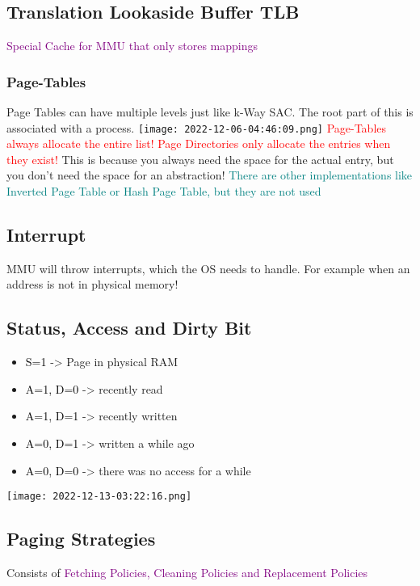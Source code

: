 \documentclass[main.tex,fontsize=8pt,paper=a4,paper=landscape,DIV=calc,]{scrartcl}
\begin{document}
\begin{multicols*}{4}
\subsection{Translation Lookaside Buffer TLB}
\textcolor{purple}{Special Cache for MMU that only stores mappings}

\subsubsection{Page-Tables}
Page Tables can have multiple levels just like k-Way SAC.\newline
The root part of this is associated with a process.\newline
\texttt{[image: 2022-12-06-04:46:09.png]}\newline
\textcolor{red}{Page-Tables always allocate the entire list! Page Directories only allocate the entries when they exist!}\newline
This is because you always need the space for the actual entry, but you don't need the space for an abstraction!
\textcolor{teal}{There are other implementations like Inverted Page Table or Hash Page Table, but they are not used}

\subsection{Interrupt}
MMU will throw interrupts, which the OS needs to handle.\newline
For example when an address is not in physical memory!\newline

\subsection{Status, Access and Dirty Bit}
\begin{itemize}
\item \textcolor{black}{S=1} -> Page in physical RAM
\item \textcolor{black}{A=1, D=0} -> recently read
\item \textcolor{black}{A=1, D=1} -> recently written
\item \textcolor{black}{A=0, D=1} -> written a while ago
\item \textcolor{black}{A=0, D=0} -> there was no access for a while
\end{itemize}
\texttt{[image: 2022-12-13-03:22:16.png]}

\subsection{Paging Strategies}
Consists of \textcolor{purple}{Fetching Policies, Cleaning Policies and Replacement Policies} 


\end{multicols*}
\end{document}

